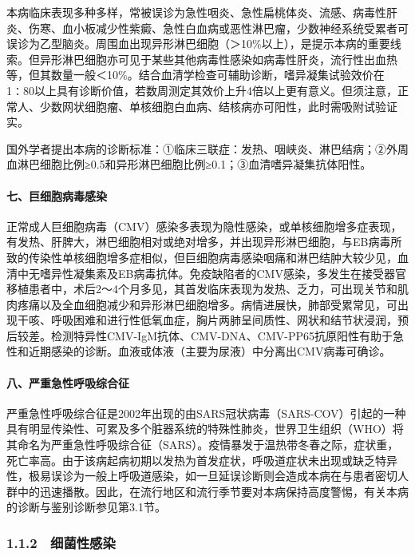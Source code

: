 本病临床表现多种多样，常被误诊为急性咽炎、急性扁桃体炎、流感、病毒性肝炎、伤寒、血小板减少性紫癜、急性白血病或恶性淋巴瘤，少数神经系统受累者可误诊为乙型脑炎。周围血出现异形淋巴细胞（＞10\%以上），是提示本病的重要线索。但异形淋巴细胞亦可见于某些其他病毒性感染如病毒性肝炎，流行性出血热等，但其数量一般＜10\%。结合血清学检查可辅助诊断，嗜异凝集试验效价在1∶80以上具有诊断价值，若数周测定其效价上升4倍以上更有意义。但须注意，正常人、少数网状细胞瘤、单核细胞白血病、结核病亦可阳性，此时需吸附试验证实。

国外学者提出本病的诊断标准：①临床三联症：发热、咽峡炎、淋巴结病；②外周血淋巴细胞比例≥0.5和异形淋巴细胞比例≥0.1；③血清嗜异凝集抗体阳性。

\paragraph{七、巨细胞病毒感染}

正常成人巨细胞病毒（CMV）感染多表现为隐性感染，或单核细胞增多症表现，有发热、肝脾大，淋巴细胞相对或绝对增多，并出现异形淋巴细胞，与EB病毒所致的传染性单核细胞增多症相似，但巨细胞病毒感染咽痛和淋巴结肿大较少见，血清中无嗜异性凝集素及EB病毒抗体。免疫缺陷者的CMV感染，多发生在接受器官移植患者中，术后2～4个月多见，其首发临床表现为发热、乏力，可出现关节和肌肉疼痛以及全血细胞减少和异形淋巴细胞增多。病情进展快，肺部受累常见，可出现干咳、呼吸困难和进行性低氧血症，胸片两肺呈间质性、网状和结节状浸润，预后较差。检测特异性CMV-IgM抗体、CMV-DNA、CMV-PP65抗原阳性有助于急性和近期感染的诊断。血液或体液（主要为尿液）中分离出CMV病毒可确诊。

\paragraph{八、严重急性呼吸综合征}

严重急性呼吸综合征是2002年出现的由SARS冠状病毒（SARS-COV）引起的一种具有明显传染性、可累及多个脏器系统的特殊性肺炎，世界卫生组织（WHO）将其命名为严重急性呼吸综合征（SARS）。疫情暴发于温热带冬春之际，症状重，死亡率高。由于该病起病初期以发热为首发症状，呼吸道症状未出现或缺乏特异性，极易误诊为一般上呼吸道感染，如一旦延误诊断则会造成本病在与患者密切人群中的迅速播散。因此，在流行地区和流行季节要对本病保持高度警惕，有关本病的诊断与鉴别诊断参见第3.1节。

\protect\hypertarget{text00014.html}{}{}

\subsubsection{1.1.2　细菌性感染}


